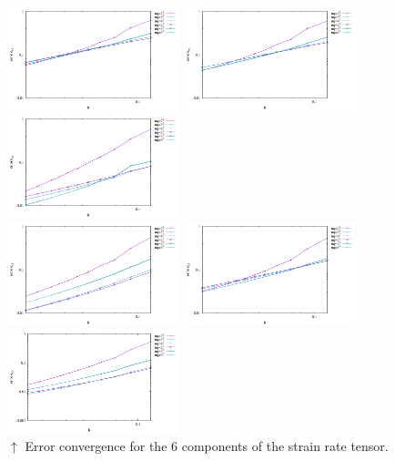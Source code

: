 \begin{center}
\includegraphics[width=5cm]{python_codes/fieldstone_75/results/burst/errors_exx}
\includegraphics[width=5cm]{python_codes/fieldstone_75/results/burst/errors_eyy}
\includegraphics[width=5cm]{python_codes/fieldstone_75/results/burst/errors_ezz}\\
\includegraphics[width=5cm]{python_codes/fieldstone_75/results/burst/errors_exy}
\includegraphics[width=5cm]{python_codes/fieldstone_75/results/burst/errors_exz}
\includegraphics[width=5cm]{python_codes/fieldstone_75/results/burst/errors_eyz}\\
{\captionfont $\uparrow$ Error convergence for the 6 components of the strain rate tensor.}
\end{center}


